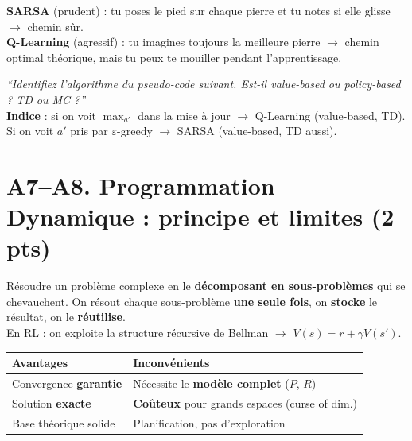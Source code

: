 \documentclass[11pt,a4paper]{article}
\begin{document}
\begin{exbox}
\textbf{SARSA} (prudent) : tu poses le pied sur chaque pierre et tu notes si elle glisse $\to$ chemin sûr.\\
\textbf{Q-Learning} (agressif) : tu imagines toujours la meilleure pierre $\to$ chemin optimal théorique, mais tu peux te mouiller pendant l'apprentissage.
\end{exbox}

\begin{exambox}
\textit{``Identifiez l'algorithme du pseudo-code suivant. Est-il value-based ou policy-based ? TD ou MC ?''}\\[4pt]
\textbf{Indice} : si on voit $\max_{a'}$ dans la mise à jour $\to$ Q-Learning (value-based, TD).\\
Si on voit $a'$ pris par $\varepsilon$-greedy $\to$ SARSA (value-based, TD aussi).
\end{exambox}

\section{A7--A8. Programmation Dynamique : principe et limites (2 pts)}

\begin{formbox}[Principe de la DP]
Résoudre un problème complexe en le \textbf{décomposant en sous-problèmes} qui se chevauchent. On résout chaque sous-problème \textbf{une seule fois}, on \textbf{stocke} le résultat, on le \textbf{réutilise}.\\[4pt]
En RL : on exploite la structure récursive de Bellman $\to$ $V(s) = r + \gamma V(s')$.
\end{formbox}

\begin{formbox}
\renewcommand{\arraystretch}{1.2}
\begin{tabular}{@{}p{6.5cm} p{6.5cm}@{}}
\toprule
\textbf{Avantages} & \textbf{Inconvénients} \\
\midrule
Convergence \textbf{garantie} & Nécessite le \textbf{modèle complet} ($P$, $R$) \\
Solution \textbf{exacte} & \textbf{Coûteux} pour grands espaces (curse of dim.) \\
Base théorique solide & Planification, pas d'exploration \\
\bottomrule
\end{tabular}
\end{formbox}
\end{document}
